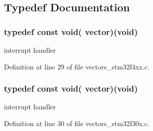 \subsection{\-Typedef \-Documentation}
\hypertarget{group___p_i_o_s_ga3c46a32d92954306e54f6e9acdd9eaac}{
\subsubsection[{vector}]{\setlength{\rightskip}{0pt plus 5cm}typedef const void( {\bf vector})(void)}}\label{group___p_i_o_s_ga3c46a32d92954306e54f6e9acdd9eaac}
interrupt handler 

\-Definition at line 29 of file vectors\-\_\-stm32f4xx.\-c.

\hypertarget{group___p_i_o_s_ga3c46a32d92954306e54f6e9acdd9eaac}{
\subsubsection[{vector}]{\setlength{\rightskip}{0pt plus 5cm}typedef const void( {\bf vector})(void)}}\label{group___p_i_o_s_ga3c46a32d92954306e54f6e9acdd9eaac}
interrupt handler 

\-Definition at line 30 of file vectors\-\_\-stm32f30x.\-c.




